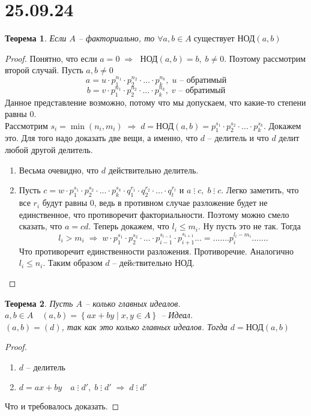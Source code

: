 \documentclass[12pt, a4paper]{article}
\newcommand{\ra}{\;\Rightarrow\;}
\newcommand{\m}{\leqslant}
\newcommand{\de}{\;\vdots\;}
\newcommand{\NoD}[2]{\text{НОД}({#1},{#2})}
\theoremstyle{plain}
\newtheorem*{Th*}{Теорема}
\theoremstyle{definition}
\begin{document}
\section*{25.09.24}
\hypertarget{p7}{}
\begin{Th*}
    Если $A$ -- факториально, то $\forall a,b\in A\;\text{существует НОД}(a,b)$
\end{Th*}
\begin{proof}

Понятно, что если $a=0\ra$ НОД$(a,b) = b,\;b\neq 0$. Поэтому рассмотрим второй случай. Пусть
 $a,b\neq 0$ \[a = u\cdot p_1^{n_1}\cdot p_2^{n_2}\cdot...\cdot p_k^{n_k},\; u\text{ -- обратимый}\]\[b = v\cdot p_1^{n_1}\cdot p_2^{n_2}\cdot...\cdot p_k^{n_k},\; v\text{ -- обратимый}\]
        Данное представление возможно, потому что мы допускаем, что какие-то степени равны 0.\\
        Рассмотрим $s_i = \min(n_i,m_i)\ra d = \NoD{a}{b} = p_1^{s_1}\cdot p_2^{s_2}\cdot...\cdot p_k^{s_k}$. Докажем это.
        Для того надо доказать две вещи, а именно, что $d$ -- делитель и что $d$ делит любой другой делитель.
        \begin{enumerate}
            \item Весьма очевидно, что $d$ действительно делитель.
            \item Пусть $c = w\cdot p_1^{s_1} \cdot p_2^{s_2}\cdot...\cdot p_k^{s_k}\cdot q_1^{r_1}\cdot q_2^{r_2}\cdot...\cdot q_t^{r_t}$ и $a\de c,\; b\de c$. Легко заметить, что все $r_i$ будут равны $0$,
            ведь в противном случае разложение будет не единственное, что противоречит факториальности. Поэтому можно смело сказать, что $a = cd$. Теперь докажем, что $l_i\m m_i$.
            Ну пусть это не так. Тогда \[l_i>m_i\ra w\cdot p_1^{s_1} \cdot p_2^{s_2}\cdot...\cdot p_{i-1}^{s_{i-1}}\cdot p_{i+1}^{s_{i+1}}... = .......p_i^{l_i-m_i}.......\]
            Что противоречит единственности разложения. Противоречие. Аналогично $l_i\m n_i$. Таким образом $d$ -- дейcтвительно НОД.
            
        \end{enumerate}

\end{proof}
\begin{Th*}
    Пусть $A$ -- колько главных идеалов. $a,b\in A\quad (a,b) = \left\{ax+by\;|\;x,y\in A\right\}$ -- Идеал.\\
    $(a,b) = (d)$, так как это колько главных идеалов. Тогда $d = \NoD{a}{b}$
\end{Th*}
\begin{proof}~\
    \begin{enumerate}
        \item $d$ -- делитель
        \item $d = ax+by\quad a\de d',\; b\de d'\ra d\de d'$
    \end{enumerate}
    Что и требовалось доказать.
\end{proof}
\end{document}
